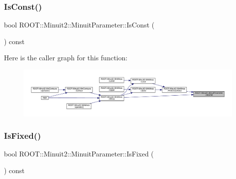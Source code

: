 \mbox{\label{classROOT_1_1Minuit2_1_1MinuitParameter_afa82fc56a19c43531f469efc1fa34c2c}} 
\subsubsection{\texorpdfstring{IsConst()}{IsConst()}\hspace{0.1cm}{\footnotesize\ttfamily [2/2]}}
{\footnotesize\ttfamily bool R\+O\+O\+T\+::\+Minuit2\+::\+Minuit\+Parameter\+::\+Is\+Const (\begin{DoxyParamCaption}{ }\end{DoxyParamCaption}) const\hspace{0.3cm}{\ttfamily [inline]}}

Here is the caller graph for this function\+:\nopagebreak
\begin{figure}[H]
\begin{center}
\leavevmode
\includegraphics[width=350pt]{dd/dfb/classROOT_1_1Minuit2_1_1MinuitParameter_afa82fc56a19c43531f469efc1fa34c2c_icgraph}
\end{center}
\end{figure}
\mbox{\label{classROOT_1_1Minuit2_1_1MinuitParameter_a2d7f48ed0d6d1ac124e390e54df4de32}} 
\subsubsection{\texorpdfstring{IsFixed()}{IsFixed()}\hspace{0.1cm}{\footnotesize\ttfamily [1/2]}}
{\footnotesize\ttfamily bool R\+O\+O\+T\+::\+Minuit2\+::\+Minuit\+Parameter\+::\+Is\+Fixed (\begin{DoxyParamCaption}{ }\end{DoxyParamCaption}) const\hspace{0.3cm}{\ttfamily [inline]}}


